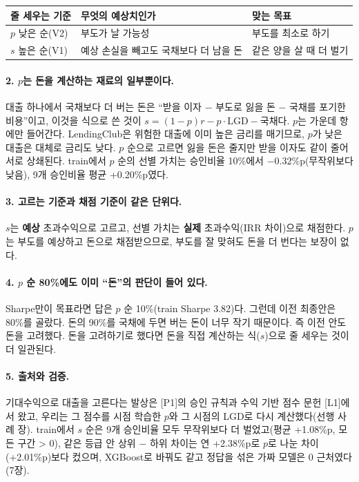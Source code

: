 \begin{table}[H]\centering\small
\begin{tabularx}{\linewidth}{@{}p{28mm}LL@{}}\toprule
줄 세우는 기준 & 무엇의 예상치인가 & 맞는 목표\\\midrule
$p$ 낮은 순(V2) & 부도가 날 가능성 & 부도를 최소로 하기\\
$s$ 높은 순(V1) & 예상 손실을 빼고도 국채보다 더 남을 돈 & 같은 양을 살 때 더 벌기\\\bottomrule
\end{tabularx}
\end{table}

\paragraph{2. $p$는 돈을 계산하는 재료의 일부뿐이다.}
대출 하나에서 국채보다 더 버는 돈은 ``받을 이자 $-$ 부도로 잃을 돈 $-$ 국채를 포기한 비용''이고, 이것을 식으로 쓴 것이 $s=(1-p)r-p\cdot\mathrm{LGD}-$국채다. $p$는 가운데 항에만 들어간다. LendingClub은 위험한 대출에 이미 높은 금리를 매기므로, $p$가 낮은 대출은 대체로 금리도 낮다. $p$ 순으로 고르면 잃을 돈은 줄지만 받을 이자도 같이 줄어 서로 상쇄된다. train에서 $p$ 순의 선별 가치는 승인비율 10\%에서 $-0.32$\%p(무작위보다 낮음), 9개 승인비율 평균 +0.20\%p였다.

\paragraph{3. 고르는 기준과 채점 기준이 같은 단위다.}
$s$는 \textbf{예상} 초과수익으로 고르고, 선별 가치는 \textbf{실제} 초과수익(IRR 차이)으로 채점한다. $p$는 부도를 예상하고 돈으로 채점받으므로, 부도를 잘 맞혀도 돈을 더 번다는 보장이 없다.

\paragraph{4. $p$ 순 80\%에도 이미 ``돈''의 판단이 들어 있다.}
Sharpe만이 목표라면 답은 $p$ 순 10\%(train Sharpe 3.82)다. 그런데 이전 최종안은 80\%를 골랐다. 돈의 90\%를 국채에 두면 버는 돈이 너무 작기 때문이다. 즉 이전 안도 돈을 고려했다. 돈을 고려하기로 했다면 돈을 직접 계산하는 식($s$)으로 줄 세우는 것이 더 일관된다.

\paragraph{5. 출처와 검증.}
기대수익으로 대출을 고른다는 발상은 [P1]의 승인 규칙과 수익 기반 점수 문헌 [L1]에서 왔고, 우리는 그 점수를 시점 학습한 $p$와 그 시점의 LGD로 다시 계산했다(선행 사례 장). train에서 $s$ 순은 9개 승인비율 모두 무작위보다 더 벌었고(평균 +1.08\%p, 모든 구간 > 0), 같은 등급 안 상위 $-$ 하위 차이는 연 +2.38\%p로 $p$로 나눈 차이(+2.01\%p)보다 컸으며, XGBoost로 바꿔도 같고 정답을 섞은 가짜 모델은 0 근처였다(7장).

